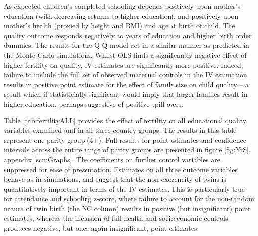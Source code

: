 \documentclass{article}[11pt,subeqn]
\begin{document}
\begin{spacing}{1.5}

As expected children's completed schooling depends positively upon mother's education (with decreasing returns to higher education), 
and positively upon mother's health (proxied by height and BMI) and age at birth of child.  The quality outcome responds negatively to 
years of education and higher birth order dummies.  The results for the Q-Q model act in a similar manner as predicted in the Monte
Carlo simulations.  Whilst OLS finds a significantly negative effect of higher fertility on quality, IV estimates are significantly
more positive.  Indeed, failure to include the full set of observed maternal controls in the IV estimation results in positive point estimate
for the effect of family size on child quality -- a result which if statisticially significant would imply that larger families result in 
higher education, perhaps suggestive of positive spill-overs. 


Table \ref{tab:fertilityALL} provides the effect of fertility on all educational quality variables examined and in all three country groups.  The results in this table represent one parity group (4+).  Full results for point estimates and confidence intervals across the entire range of parity groups are presented in figure \ref{fig:YrS}, appendix \ref{scn:Graphs}. The coefficients on further control variables are suppressed for ease of presentation. Estimates on all three outcome variables behave as in simulations, and suggest that the non-exogeneity of twins is quantitatively important in terms of the IV estimates.  This is particularly true for attendance and schooling z-score, where failure to account for the non-random nature of twin birth (the NC column) results in positive (but insignificant) point estimates, whereas the inclusion of full health and socioeconomic controls produces negative, but once again insignificant, point estimates.


\end{spacing}
\end{document}
